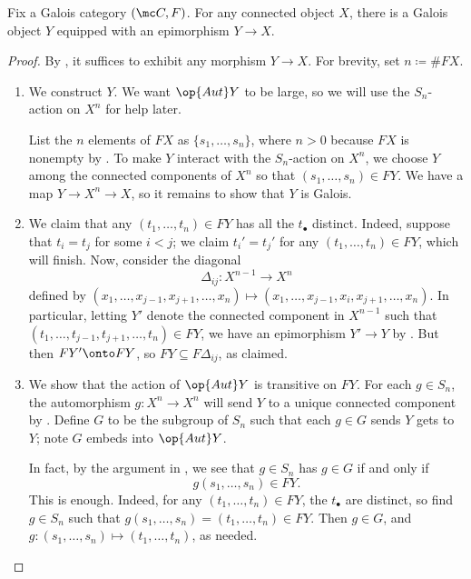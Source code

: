 \documentclass{amsart}
\begin{document}
\begin{proposition} \label{prop:galois-cover}
    Fix a Galois category $(\mc C,F)$. For any connected object $X$, there is a Galois object $Y$ equipped with an epimorphism $Y\to X$.
\end{proposition}
\begin{proof}
    By , it suffices to exhibit any morphism $Y\to X$. For brevity, set $n\coloneqq\#FX$.
    \begin{enumerate}
        \item We construct $Y$. We want $\op{Aut}Y$ to be large, so we will use the $S_n$-action on $X^n$ for help later.

        List the $n$ elements of $FX$ as $\{s_1,\ldots,s_n\}$, where $n>0$ because $FX$ is nonempty by . To make $Y$ interact with the $S_n$-action on $X^n$, we choose $Y$ among the connected components of $X^n$ so that $(s_1,\ldots,s_n)\in FY$. We have a map $Y\to X^n\to X$, so it remains to show that $Y$ is Galois.

        \item We claim that any $(t_1,\ldots,t_n)\in FY$ has all the $t_\bullet$ distinct. Indeed, suppose that $t_i=t_j$ for some $i<j$; we claim $t_i'=t_j'$ for any $(t_1,\ldots,t_n)\in FY$, which will finish. Now, consider the diagonal
        \[\Delta_{ij}\colon X^{n-1}\to X^n\]
        defined by $(x_1,\ldots,x_{j-1},x_{j+1},\ldots,x_n)\mapsto(x_1,\ldots,x_{j-1},x_i,x_{j+1},\ldots,x_n)$. In particular, letting $Y'$ denote the connected component in $X^{n-1}$ such that $(t_1,\ldots,t_{j-1},t_{j+1},\ldots,t_n)\in FY$, we have an epimorphism $Y'\to Y$ by . But then $FY'\onto FY$, so $FY\subseteq F\Delta_{ij}$, as claimed.

        \item We show that the action of $\op{Aut}Y$ is transitive on $FY$. For each $g\in S_n$, the automorphism $g\colon X^n\to X^n$ will send $Y$ to a unique connected component by . Define $G$ to be the subgroup of $S_n$ such that each $g\in G$ sends $Y$ gets to $Y$; note $G$ embeds into $\op{Aut}Y$.

        In fact, by the argument in , we see that $g\in S_n$ has $g\in G$ if and only if
        \[g(s_1,\ldots,s_n)\in FY.\]
        This is enough. Indeed, for any $(t_1,\ldots,t_n)\in FY$, the $t_\bullet$ are distinct, so find $g\in S_n$ such that $g(s_1,\ldots,s_n)=(t_1,\ldots,t_n)\in FY$. Then $g\in G$, and $g\colon(s_1,\ldots,s_n)\mapsto(t_1,\ldots,t_n)$, as needed.
        \qedhere
    \end{enumerate}
\end{proof}
\end{document}
